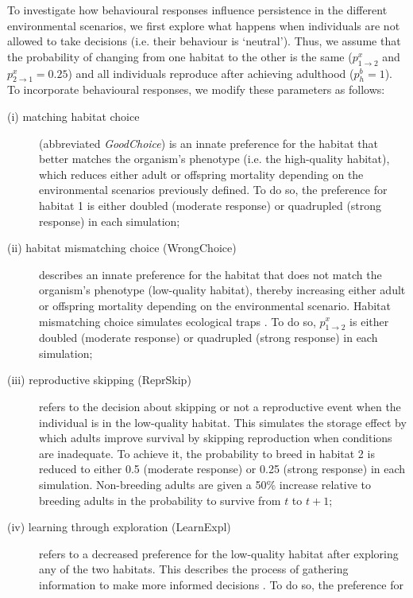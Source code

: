 To investigate how behavioural responses influence persistence
in the different environmental scenarios, we first explore
what happens when individuals are not allowed to take
decisions (i.e. their behaviour is ‘neutral’). Thus, we assume
that the probability of changing from one habitat to the other
is the same ($p^{x}_{1 \rightarrow 2}$ and $p^{x}_{2 \rightarrow1} = 0.25$) and all individuals reproduce
after achieving adulthood ($p^{b}_{h} = 1$). To incorporate
behavioural responses, we modify these parameters as follows:
\begin{description}
  \item[(i) matching habitat choice] (abbreviated \textit{GoodChoice}) is an
    innate preference for the habitat that better matches
    the organism’s phenotype (i.e. the high-quality habitat),
    which reduces either adult or offspring mortality
    depending on the environmental scenarios previously
    defined. To do so, the preference for habitat 1 is either
    doubled (moderate response) or quadrupled (strong
    response) in each simulation;
  \item[(ii) habitat mismatching choice (WrongChoice)] describes an
    innate preference for the habitat that does not match
    the organism’s phenotype (low-quality habitat), thereby
    increasing either adult or offspring mortality depending
    on the environmental scenario. Habitat mismatching
    choice simulates ecological traps \citep{Kokko2001}. To do so, $p^{x}_{1 \rightarrow 2}$ is
    either doubled (moderate response) or quadrupled
    (strong response) in each simulation;
  \item[(iii) reproductive skipping (ReprSkip)] refers to the decision
    about skipping or not a reproductive event when the
    individual is in the low-quality habitat. This simulates
    the storage effect \citep{Warner1985a} by which adults improve survival
    by skipping reproduction when conditions are
    inadequate. To achieve it, the probability to breed in
    habitat 2 is reduced to either 0.5 (moderate response)
    or 0.25 (strong response) in each simulation. Non-breeding
    adults are given a 50\% increase relative to breeding
    adults in the probability to survive from $t$ to $t + 1$;
  \item[(iv) learning through exploration (LearnExpl)] refers to a
    decreased preference for the low-quality habitat after
    exploring any of the two habitats. This describes the
    process of gathering information to make more
    informed decisions \citep{Eliassen2009}. To do so, the preference for

\end{description}
